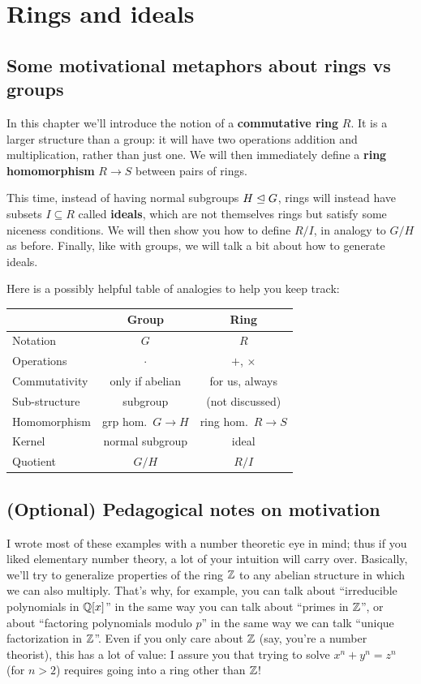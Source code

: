 \chapter{Rings and ideals}
\label{ch:rings_ideals}
\section{Some motivational metaphors about rings vs groups}
In this chapter we'll introduce the notion of
a \textbf{commutative ring} $R$.
It is a larger structure than a group:
it will have two operations addition and multiplication,
rather than just one.
We will then immediately define a \textbf{ring homomorphism}
$R \to S$ between pairs of rings.

This time, instead of having normal subgroups $H \trianglelefteq G$,
rings will instead have subsets $I \subseteq R$ called \textbf{ideals},
which are not themselves rings but satisfy some niceness conditions.
We will then show you how to define $R/I$,
in analogy to $G/H$ as before.
Finally, like with groups, we will talk a bit about how to generate ideals.

Here is a possibly helpful table of analogies to help you keep track:
\begin{center}
	\begin{tabular}[h]{lcc}
		& Group & Ring \\
		\hline
		Notation & $G$ & $R$ \\
		Operations & $\cdot$ & $+$, $\times$ \\
		Commutativity & only if abelian & for us, always \\
		Sub-structure & subgroup & (not discussed) \\
		Homomorphism & grp hom.\ $G \to H$ & ring hom.\ $R \to S$ \\ %
		Kernel & normal subgroup & ideal \\
		Quotient & $G/H$ & $R/I$ \\
	\end{tabular}
\end{center}

\section{(Optional) Pedagogical notes on motivation}
I wrote most of these examples with a number theoretic eye in mind;
thus if you liked elementary number theory,
a lot of your intuition will carry over.
Basically, we'll try to generalize properties of the ring $\mathbb Z$ to
any abelian structure in which we can also multiply.
That's why, for example, you can talk about
``irreducible polynomials in $\mathbb Q[x]$'' in the same
way you can talk about ``primes in $\mathbb Z$'',
or about ``factoring polynomials modulo $p$''
in the same way we can talk ``unique factorization in $\mathbb Z$''.
Even if you only care about $\mathbb Z$
(say, you're a number theorist), this has a lot of value:
I assure you that trying to solve $x^n+y^n = z^n$ (for $n > 2$)
requires going into a ring other than $\mathbb Z$!


